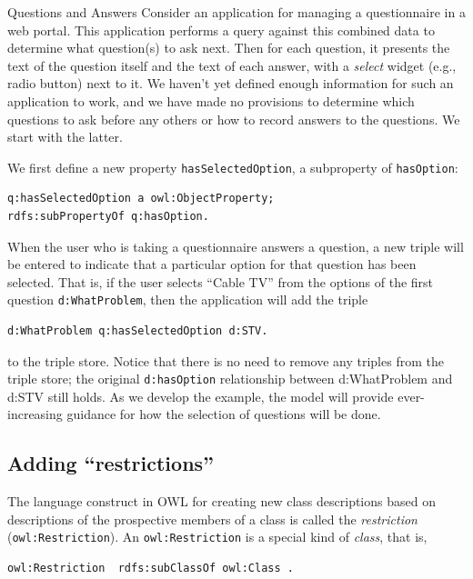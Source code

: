 \begin{example}{Questions and Answers}
Consider an application for managing a questionnaire in a web portal.
This application performs a query against this combined data to
determine what question(s) to ask next. Then for each question, it
presents the text of the question itself and the text of each answer,
with a \emph{select} widget (e.g., radio button) next to it. We haven't yet
defined enough information for such an application to work, and we have
made no provisions to determine which questions to ask before any others
or how to record answers to the questions. We start with the latter.

We first define a new property \texttt{hasSelectedOption}, a subproperty of
\texttt{hasOption}:

\begin{lstlisting}
q:hasSelectedOption a owl:ObjectProperty;
rdfs:subPropertyOf q:hasOption.
\end{lstlisting}

When the user who is taking a questionnaire answers a question, a new
triple will be entered to indicate that a particular option for that
question has been selected. That is, if the user selects ``Cable TV''
from the options of the first question \texttt{d:WhatProblem}, then the
application will add the triple

\begin{lstlisting}
d:WhatProblem q:hasSelectedOption d:STV.
\end{lstlisting}

to the triple store. Notice that there is no need to remove any triples
from the triple store; the original \texttt{d:hasOption} relationship between
d:WhatProblem and d:STV still holds. As we develop the example, the
model will provide ever-increasing guidance for how the selection of
questions will be done.

\end{example}

\subsection{Adding ``restrictions''}

The language construct in OWL for creating new class descriptions based
on descriptions of the prospective members of a class is called the
\emph{restriction} (\texttt{owl:Restriction}). An \texttt{owl:Restriction} is a special kind of
\emph{class}, that is, 

\begin{lstlisting}
owl:Restriction  rdfs:subClassOf owl:Class .
\end{lstlisting}

